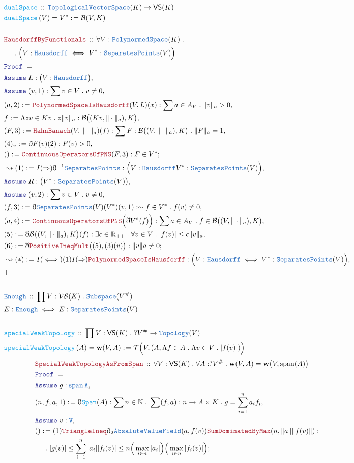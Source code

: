 \documentclass[12pt]{scrartcl}
\newcommand{\TYPE}[1]{\textcolor{NavyBlue}{\mathtt{#1}}}
\newcommand{\FUNC}[1]{\textcolor{Cerulean}{\mathtt{#1}}}
\newcommand{\LOGIC}[1]{\textcolor{Blue}{\mathtt{#1}}}
\newcommand{\THM}[1]{\textcolor{Maroon}{\mathtt{#1}}}
\renewcommand{\.}{\; . \;}
\newcommand{\de}{: \kern 0.1pc =}
\newcommand{\Act}[1]{\left( #1 \right)}
\newcommand{\Theorem}[2]{& \THM{#1} \, :: \, #2 \\ & \Proof = \\ }
\newcommand{\DeclareType}[2]{& \TYPE{#1} \, :: \, #2 \\}
\newcommand{\DefineType}[3]{& #1 : \TYPE{#2} \iff #3 \\}
\newcommand{\DeclareFunc}[2]{& \FUNC{#1} \, :: \, #2 \\}
\newcommand{\DefineNamedFunc}[4]{&  \FUNC{#1}\Act{#2} = #3 \de #4 \\}
\newcommand{\NewLine}{\\ & \kern 1pc}
\newcommand{\Page}[1]{\begin{align*} #1 \end{align*} \newpage   }
\newcommand{ \bd }{ \ByDef }
\newcommand{\Reals}{\mathbb{R} }
\newcommand{\Nat}{\mathbb{N} }
\newcommand{\Say}[3]{& #1 \de #2 : #3, \\}
\newcommand{\Conclude}[3]{& #1 \de #2 : #3; \\}
\newcommand{\Derive}[3]{& \leadsto #1 \de #2 : #3, \\}
\newcommand{\A}{\LOGIC{Assume} \;}
\newcommand{\Assume}[2]{& \A #1 : #2, \\}
\newcommand{\QED}{\; \square}
\newcommand{\EndProof}{& \QED \\}
\newcommand{\ByDef}{\eth}
\newcommand{\Proof}{\LOGIC{Proof} \; }
\DeclareMathOperator{\Span}{span}
\newcommand{\PNS}{\TYPE{PolynormedSpace}}
\newcommand{\TVS}{\TYPE{TopologicalVectorSpace}}
\newcommand{\B}{\mathcal{B}}
\begin{document}
\Page{
 \DeclareFunc{dualSpace}{ \TVS(K) \to \mathsf{VS}(K)  }
 \DefineNamedFunc{dualSpace}{V}{V^*}{\B(V,K)}
 \\
 \Theorem{HausdorffByFunctionals}{\forall V : \PNS(K) \. \NewLine \. \Big( V : \TYPE{Hausdorff} \iff V^* : \TYPE{SeparatesPoints}(V) \Big) }
 \Assume{L}{  \big( V : \TYPE{Hausdorff} \big) }
 \Assume{(v,1)}{ \sum v \in V \. v \neq 0 }
 \Say{(a,2)}{\THM{PolynormedSpaceIsHausdorff}(V,L)(x)}{ \sum a \in A_V \. \| v \|_a > 0 }
 \Say{f}{ \Lambda zv \in Kv \. z\| v \|_a }{\mathcal{B}\big((Kv,\|\cdot\|_a),K\big)}
 \Say{(F,3)}{\THM{HahnBanach}(V, \|\cdot\|_a )(f)}{ \sum F : \B\big( (V, \|\cdot \|_a ),K \big) \. \| F \|_a = 1  }
 \Say{(4)_v}{\bd F(v)(2) }{ F(v) > 0   }
 \Conclude{()}{\THM{ContinuousOperatorsOfPNS}(F,3)}{ F \in V^* }
 \Derive{(1)}{I(\Rightarrow)\bd^{-1} \TYPE{SeparatesPoints}}{\Big( V : \TYPE{Hausdorff}  V^* : \TYPE{SeparatesPoints}(V)\Big) }
 \Assume{R}{ \big( V^* : \TYPE{SeparatesPoints}(V) \big)  }
 \Assume{(v,2)}{ \sum v \in V \.  v \neq 0}
 \Say{(f,3)}{\bd \TYPE{SeparatesPoints}(V)(V^*)(v,1)}{ \sim f \in V^* \. f(v) \neq 0  }
 \Say{(a,4)}{ \THM{ContinuousOperatorsOfPNS} \Big(\bd V^*(f)\Big)}{ \sum a \in A_V \.  f \in \B\big( (V,\| \cdot \|_a), K \big) }
 \Say{(5)}{ \bd \B\big( (V,\| \cdot \|_a), K \big)(f)}{\exists c \in \Reals_{++} \. \forall v \in V \. |f(v)| \le c\| v \|_a}
 \Conclude{(6)}{ \bd \THM{PositiveIneqMult}\big( (5),(3)(v) \big)}{ \| v \| a \neq 0  }
 \Derive{(*)}{I(\iff)(1)I(\Rightarrow)\THM{PolynormedSpaceIsHausforff}}{ \Big( V : \TYPE{Hausdorff} \iff V^* : \TYPE{SeparatesPoints}(V) \Big)}
 \EndProof \\
 \DeclareType{Enough}{\prod V : \mathcal{VS}(K) \. \TYPE{Subspace}(V^\#) }
 \DefineType{E}{Enough}{ E : \TYPE{SeparatesPoints}(V) }
 \\
 \DeclareFunc{specialWeakTopology}{ \prod V : \mathsf{VS}(K) \. ?V^\# \to \TYPE{Topology}(V)}
 \DefineNamedFunc{specialWeakTopology}{A}{ \mathbf{w}(V,A)  }{ \mathcal{T}\Big( V, (A, \Lambda f \in A \. \Lambda v \in V \. |f(v)|) \Big)  }
 } \Page{
 \Theorem{SpecialWeakTopologyAsFromSpan}{ \forall V : \mathsf{VS}(K) \. \forall A : ?V^\# \. \mathbf{w}(V,A) = \mathbf{w}\big(V, \Span(A) \big) }
 \Assume{ g }{ \TYPE{ \Span{A} } }
 \Say{ (n,f, a , 1)  }{ \bd \FUNC{Span}(A)  }{ \sum n \in \Nat \. \sum (f,a) : n \to A \times K \. g = \sum^n_{i = 1} a_i f_i }
 \Assume{v}{\TYPE{V}}
 \Conclude{()}{  (1)\THM{TriangleIneq}\bd_2 \TYPE{AbsaluteValueField}( a , f(v) ) \THM{SumDominatedByMax}(n, \|a\|\|f(v)\| ) }
 {  \NewLine \.  |g(v)| \le \sum^n_{i = 1} |a_i||f_i(v)| \le  n\Big( \max_{i \in n} | a_i| \Big)\Big( \max_{i \in n} |f_i(v)| \Big)    }
}
\end{document}
